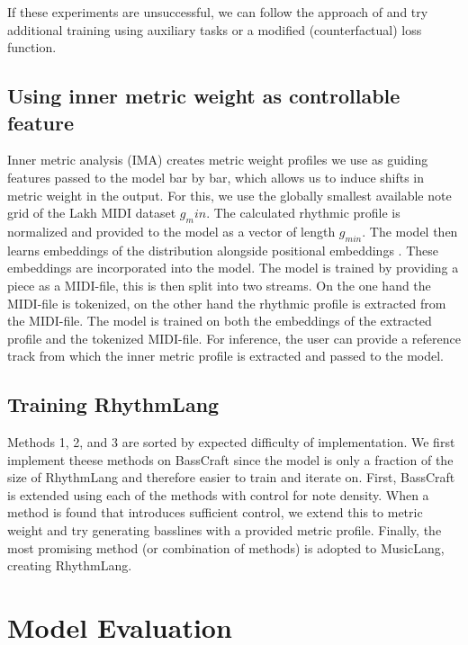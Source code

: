 If these experiments are unsuccessful, we can follow the approach of \cite{Shu_Xu_Musebarcontrol_2024} and try additional training using auxiliary tasks or a modified (counterfactual) loss function. 

\subsection{Using inner metric weight as controllable feature}
Inner metric analysis (IMA) creates metric weight profiles we use as guiding features passed to the model bar by bar, which allows us to induce shifts in metric weight in the output. 
For this, we use the globally smallest available note grid of the Lakh MIDI dataset $g_min$. The calculated rhythmic profile is normalized and provided to the model as a vector of length $g_{min}$. 
The model then learns embeddings of the distribution alongside positional embeddings \cite{Lin_cocomulla_2024}. These embeddings are incorporated into the model. 
The model is trained by providing a piece as a MIDI-file, this is then split into two streams. On the one hand the MIDI-file is tokenized, on the other hand the rhythmic profile is extracted from the MIDI-file. The model is trained on both the embeddings of the extracted profile and the tokenized MIDI-file. 
For inference, the user can provide a reference track from which the inner metric profile is extracted and passed to the model. 

\subsection{Training RhythmLang}
Methods 1, 2, and 3 are sorted by expected difficulty of implementation. We first implement theese methods on BassCraft since the model is only a fraction of the size of RhythmLang and therefore easier to train and iterate on. First, BassCraft is extended using each of the methods with control for note density. When a method is found that introduces sufficient control, we extend this to metric weight and try generating basslines with a provided metric profile. Finally, the most promising method (or combination of methods) is adopted to MusicLang, creating RhythmLang.

\section{Model Evaluation}
